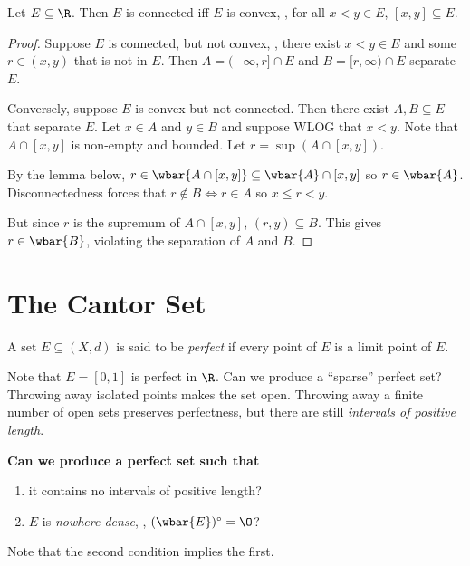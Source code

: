 \begin{theorem*}
    Let $E \subseteq \R$.
    Then $E$ is connected iff $E$ is convex, \ie, for all $x < y \in E$,
    $[x, y] \subseteq E$.
\end{theorem*}
\begin{proof}
    Suppose $E$ is connected, but not convex, \ie, there exist $x < y \in E$
    and some $r \in (x, y)$ that is not in $E$.
    Then $A = (-\infty, r] \cap E$ and $B = [r, \infty) \cap E$ separate
    $E$.

    Conversely, suppose $E$ is convex but not connected.
    Then there exist $A, B \subseteq E$ that separate $E$.
    Let $x \in A$ and $y \in B$ and suppose WLOG that $x < y$.
    Note that $A \cap [x, y]$ is non-empty and bounded.
    Let $r = \sup(A \cap [x, y])$.

    By the lemma below, $r \in \wbar{A \cap [x, y]} \subseteq \wbar{A}
    \cap [x, y]$ so $r \in \wbar{A}$.
    Disconnectedness forces that $r \notin B \iff r \in A$ so $x \le r < y$.

    But since $r$ is the supremum of $A \cap [x, y]$, $(r, y) \subseteq B$.
    This gives $r \in \wbar{B}$, violating the separation of $A$ and $B$.
\end{proof}

\section{The Cantor Set} \label{sec:cantor_set}
\begin{definition*} \label{def:perfect_set}
    A set $E \subseteq (X, d)$ is said to be \emph{perfect} if every point
    of $E$ is a limit point of $E$.
\end{definition*}
Note that $E = [0, 1]$ is perfect in $\R$.
Can we produce a ``sparse'' perfect set?
Throwing away isolated points makes the set open.
Throwing away a finite number of open sets preserves perfectness, but there
are still \emph{intervals of positive length}.

\textbf{Can we produce a perfect set such that}
\begin{enumerate}
    \item it contains no intervals of positive length?
    \item $E$ is \emph{nowhere dense}, \ie, $(\wbar{E})^\circ = \O$?
\end{enumerate}
Note that the second condition implies the first.

